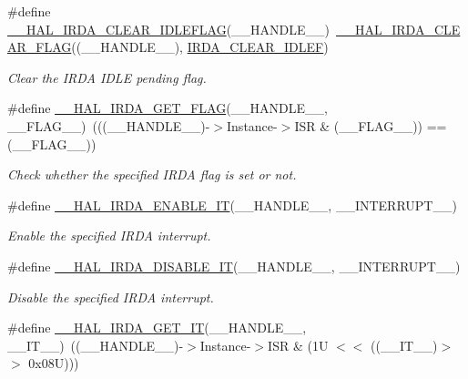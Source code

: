 \begin{DoxyCompactItemize}
\#define \hyperlink{group___i_r_d_a___exported___macros_ga8fe7de0106f994c56fdff184215dbcbf}{\+\_\+\+\_\+\+H\+A\+L\+\_\+\+I\+R\+D\+A\+\_\+\+C\+L\+E\+A\+R\+\_\+\+I\+D\+L\+E\+F\+L\+AG}(\+\_\+\+\_\+\+H\+A\+N\+D\+L\+E\+\_\+\+\_\+)~\hyperlink{group___i_r_d_a___exported___macros_ga4ebf474ecfd858f9320bef9bc67c0bce}{\+\_\+\+\_\+\+H\+A\+L\+\_\+\+I\+R\+D\+A\+\_\+\+C\+L\+E\+A\+R\+\_\+\+F\+L\+AG}((\+\_\+\+\_\+\+H\+A\+N\+D\+L\+E\+\_\+\+\_\+), \hyperlink{group___i_r_d_a___i_t___c_l_e_a_r___flags_ga25e9b5108318d697e308bdc09d1d5597}{I\+R\+D\+A\+\_\+\+C\+L\+E\+A\+R\+\_\+\+I\+D\+L\+EF})
\begin{DoxyCompactList}\small\item\em Clear the I\+R\+DA I\+D\+LE pending flag. \end{DoxyCompactList}\item 
\#define \hyperlink{group___i_r_d_a___exported___macros_ga032a53fbbc65bfd0fff2b4a26c52e790}{\+\_\+\+\_\+\+H\+A\+L\+\_\+\+I\+R\+D\+A\+\_\+\+G\+E\+T\+\_\+\+F\+L\+AG}(\+\_\+\+\_\+\+H\+A\+N\+D\+L\+E\+\_\+\+\_\+,  \+\_\+\+\_\+\+F\+L\+A\+G\+\_\+\+\_\+)~(((\+\_\+\+\_\+\+H\+A\+N\+D\+L\+E\+\_\+\+\_\+)-\/$>$Instance-\/$>$I\+SR \& (\+\_\+\+\_\+\+F\+L\+A\+G\+\_\+\+\_\+)) == (\+\_\+\+\_\+\+F\+L\+A\+G\+\_\+\+\_\+))
\begin{DoxyCompactList}\small\item\em Check whether the specified I\+R\+DA flag is set or not. \end{DoxyCompactList}\item 
\#define \hyperlink{group___i_r_d_a___exported___macros_gae9ccdc86c1bcb8ed3857474d8c3823fa}{\+\_\+\+\_\+\+H\+A\+L\+\_\+\+I\+R\+D\+A\+\_\+\+E\+N\+A\+B\+L\+E\+\_\+\+IT}(\+\_\+\+\_\+\+H\+A\+N\+D\+L\+E\+\_\+\+\_\+,  \+\_\+\+\_\+\+I\+N\+T\+E\+R\+R\+U\+P\+T\+\_\+\+\_\+)
\begin{DoxyCompactList}\small\item\em Enable the specified I\+R\+DA interrupt. \end{DoxyCompactList}\item 
\#define \hyperlink{group___i_r_d_a___exported___macros_ga8c3dd373ded6fa0790e65f54ac1f548d}{\+\_\+\+\_\+\+H\+A\+L\+\_\+\+I\+R\+D\+A\+\_\+\+D\+I\+S\+A\+B\+L\+E\+\_\+\+IT}(\+\_\+\+\_\+\+H\+A\+N\+D\+L\+E\+\_\+\+\_\+,  \+\_\+\+\_\+\+I\+N\+T\+E\+R\+R\+U\+P\+T\+\_\+\+\_\+)
\begin{DoxyCompactList}\small\item\em Disable the specified I\+R\+DA interrupt. \end{DoxyCompactList}\item 
\#define \hyperlink{group___i_r_d_a___exported___macros_ga497a23967c020f441e84db1ec8508b27}{\+\_\+\+\_\+\+H\+A\+L\+\_\+\+I\+R\+D\+A\+\_\+\+G\+E\+T\+\_\+\+IT}(\+\_\+\+\_\+\+H\+A\+N\+D\+L\+E\+\_\+\+\_\+,  \+\_\+\+\_\+\+I\+T\+\_\+\+\_\+)~((\+\_\+\+\_\+\+H\+A\+N\+D\+L\+E\+\_\+\+\_\+)-\/$>$Instance-\/$>$I\+SR \& (1\+U $<$$<$ ((\+\_\+\+\_\+\+I\+T\+\_\+\+\_\+)$>$$>$ 0x08\+U)))

\end{DoxyCompactItemize}
